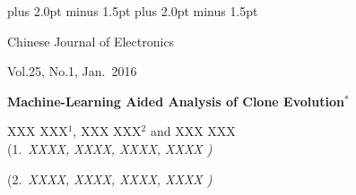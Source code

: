 \documentclass[twoside]{article}
\begin{document}
\newtheorem{theorem}{Theorem}
\newtheorem{proposition}{Proposition}
\newtheorem{remark}{Remark}
\newtheorem{proof}{Proof}
\def\footnoterule{\kern 1mm \hrule width 12cm \kern 2mm}
\abovedisplayskip=8.0pt plus 2.0pt minus 1.5pt
\belowdisplayskip=8.0pt plus 2.0pt minus 1.5pt
 \def\thefootnote{}
\TagsOnRight
\def\kh{\baselineskip}

\thispagestyle{empty}
\noindent Chinese Journal of Electronics

\noindent Vol.25, No.1, Jan.\ 2016

\vskip 2cm

\begin{center}\huge\bf
Machine-Learning Aided Analysis of Clone Evolution$^*$
\end{center}

\vskip 4mm

\begin{center}\large\rm
XXX XXX$^{1}$, XXX XXX$^{2}$ and XXX XXX %
\\\vskip1mm
{\small(1.~\it XXXX, XXXX, XXXX, XXXX%
\rm)}

{\small(2.~\it XXXX, XXXX, XXXX, XXXX%
\rm)}

\end{center}
\end{document}
